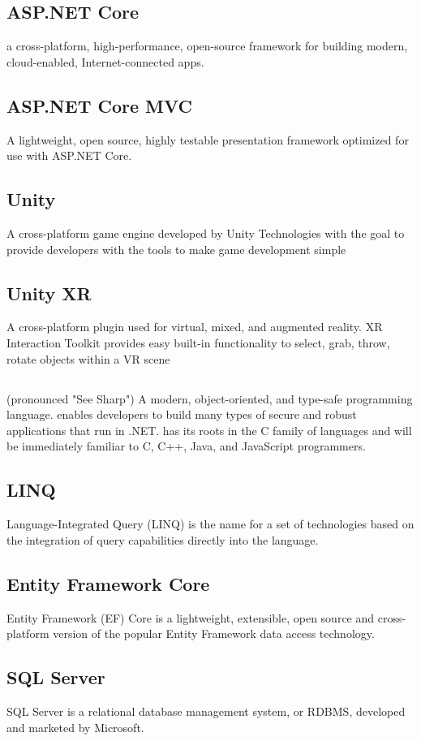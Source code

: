\subsection*{ASP.NET Core}
a cross-platform, high-performance, open-source framework for building modern, cloud-enabled, Internet-connected apps.
\subsection*{ASP.NET Core MVC}
A lightweight, open source, highly testable presentation framework optimized for use with ASP.NET Core.
\subsection*{Unity}
A cross-platform game engine developed by Unity Technologies with the goal to provide developers with the tools to make game development simple
\subsection*{Unity XR}
A cross-platform plugin used for virtual, mixed, and augmented reality. XR Interaction Toolkit provides easy built-in functionality to select, grab, throw, rotate objects within a VR scene
\subsection*{\C}
(pronounced "See Sharp") A modern, object-oriented, and type-safe programming language. \C enables developers to build many types of secure and robust applications that run in .NET. \C has its roots in the C family of languages and will be immediately familiar to C, C++, Java, and JavaScript programmers.
\subsection*{LINQ}
Language-Integrated Query (LINQ) is the name for a set of technologies based on the integration of query capabilities directly into the \C language. 
\subsection*{Entity Framework Core}
Entity Framework (EF) Core is a lightweight, extensible, open source and cross-platform version of the popular Entity Framework data access technology.
\subsection*{SQL Server}
SQL Server is a relational database management system, or RDBMS, developed and marketed by Microsoft.
